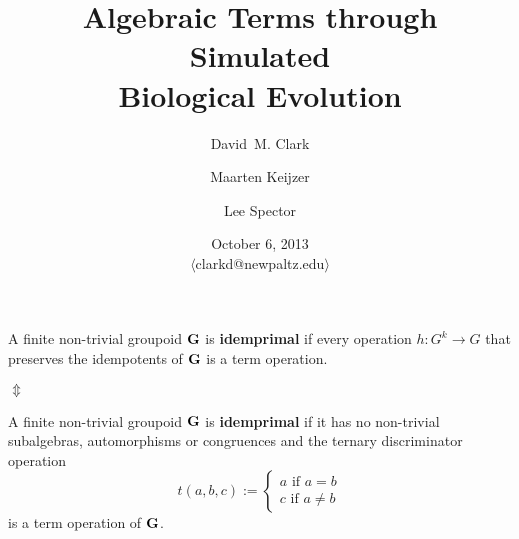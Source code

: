 \documentclass{beamer}
\newcommand{\G}{{\rm{\textbf{G}}}}
\begin{document}
\title {Algebraic Terms through Simulated \\Biological Evolution}
\author[D.Clark et al.]{David~M. Clark \and Maarten Keijzer \and Lee Spector}
\date{October 6, 2013\\
${}$\\
 
$\langle$clarkd@newpaltz.edu$\rangle$
}

\begin{frame}
\titlepage
\end{frame}


\begin{comment}
\section[Outline]{Outline}

\begin{frame}
Outline:
\pause
\begin{enumerate}
   \item sample term generation problem\pause
   \item prior methods to solve term generation problems\pause
   \item evolutionary computation\pause
   \item main theorem:  conditions for EC to succeed\pause
   \item sample solution
\end{enumerate}
\end{frame}
\end{comment}



\section[Sample Problem]{}


\begin{frame}

A finite non-trivial groupoid $\G$ is \textbf{idemprimal} if  every operation $h:G^k \to G$ that preserves the idempotents of $\G$ is a term operation.
\pause   
\medskip

\centerline{$\Updownarrow$} 
\bigskip


 A finite non-trivial groupoid $\G$ is \textbf{idemprimal} if it has no non-trivial subalgebras, automorphisms or congruences and the ternary discriminator operation
\[
t(a,b,c) := 
\begin{cases}
   a  \mbox{ if } a=b\\
   c  \mbox{ if } a\neq b
\end{cases}
\]
is a term operation of $\G$.
\end{frame}
\end{document}
